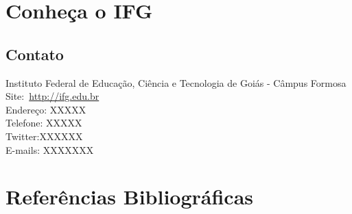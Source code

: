 \documentclass[11pt,fleqn]{book} %
\begin{document}
\chapter{Conheça o IFG}
\vspace{12em}

\section{Contato}

Instituto Federal de Educação, Ciência e Tecnologia de Goiás - Câmpus Formosa\\
Site:~\url{http://ifg.edu.br}\\
Endereço: XXXXX\\
Telefone: XXXXX \\
Twitter:XXXXXX \\
E-mails: XXXXXXX





%

\chapter*{Referências Bibliográficas}

\vspace{12em}
\printbibliography[heading=bibempty]



%
\end{document}

